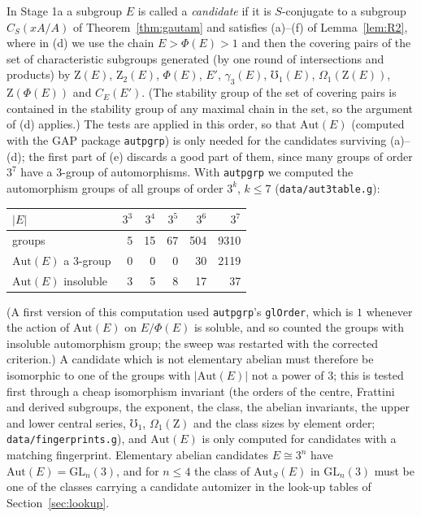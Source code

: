 \documentclass[11pt]{article}
\theoremstyle{definition}
\theoremstyle{remark}
\newcommand{\Aut}{\mathrm{Aut}}
\newcommand{\GL}{\mathrm{GL}}
\newcommand{\Z}{\mathrm{Z}}
\newcommand{\Phifr}{\Phi}
\begin{document}
In Stage 1a a subgroup $E$ is called a \emph{candidate} if it is
$S$-conjugate to a subgroup $C_S(xA/A)$ of Theorem~\ref{thm:gautam} and
satisfies (a)--(f) of Lemma~\ref{lem:R2}, where in (d) we use the chain
$E>\Phifr(E)>1$ and then the covering pairs of the set of characteristic
subgroups generated (by one round of intersections and products) by
$\Z(E)$, $\Z_2(E)$, $\Phifr(E)$, $E'$, $\gamma_3(E)$, $\mho_1(E)$,
$\Omega_1(\Z(E))$, $\Z(\Phifr(E))$ and $C_E(E')$.  (The stability group of
the set of covering pairs is contained in the stability group of any
maximal chain in the set, so the argument of (d) applies.)  The tests are
applied in this order, so that $\Aut(E)$ (computed with the GAP package
\texttt{autpgrp}) is only needed for the candidates surviving (a)--(d);
the first part of (e) discards a good part of them, since many groups of
order $3^7$ have a $3$-group of automorphisms.  With
\texttt{autpgrp} we computed the automorphism groups of all groups of order
$3^k$, $k\le7$ (\texttt{data/aut3table.g}):
\begin{center}
\begin{tabular}{lrrrrr}
\toprule
$|E|$ & $3^3$ & $3^4$ & $3^5$ & $3^6$ & $3^7$\\
\midrule
groups & 5 & 15 & 67 & 504 & 9310\\
$\Aut(E)$ a $3$-group & 0 & 0 & 0 & 30 & 2119\\
$\Aut(E)$ insoluble & 3 & 5 & 8 & 17 & 37\\
\bottomrule
\end{tabular}
\end{center}
(A first version of this computation used \texttt{autpgrp}'s
\texttt{glOrder}, which is $1$ whenever the action of $\Aut(E)$ on
$E/\Phifr(E)$ is soluble, and so counted the groups with insoluble
automorphism group; the sweep was restarted with the corrected criterion.)
A candidate which is not elementary abelian must therefore be isomorphic to
one of the groups with $|\Aut(E)|$ not a power of $3$; this is tested first through a cheap
isomorphism invariant (the orders of the centre, Frattini and derived
subgroups, the exponent, the class, the abelian invariants, the upper and
lower central series, $\mho_1$, $\Omega_1(\Z)$ and the class sizes by
element order; \texttt{data/fingerprints.g}), and $\Aut(E)$ is only
computed for candidates with a matching fingerprint.  Elementary abelian
candidates $E\cong 3^n$ have $\Aut(E)=\GL_n(3)$, and for $n\le4$ the
class of $\Aut_S(E)$ in $\GL_n(3)$ must be one of the classes carrying a
candidate automizer in the look-up tables of Section~\ref{sec:lookup}.
\end{document}
